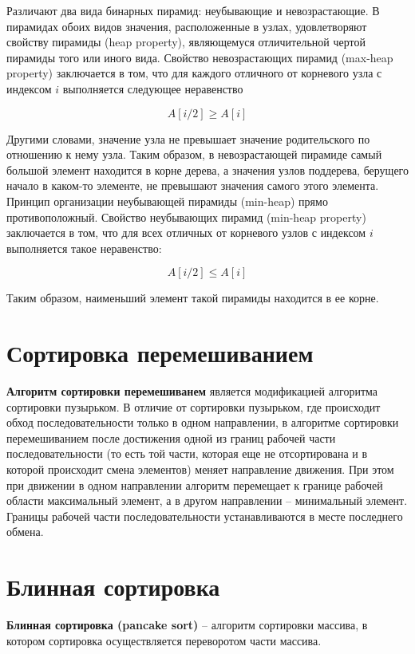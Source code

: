 Различают два вида бинарных пирамид: неубывающие и невозрастающие. В пирамидах обоих видов значения, расположенные в узлах, удовлетворяют свойству пирамиды (heap property), являющемуся отличительной чертой пирамиды того или иного вида. Свойство невозрастающих пирамид (max-heap property) заключается в том, что для каждого отличного от корневого узла с индексом $i$ выполняется следующее неравенство

\begin{equation}
	A[i / 2] \geq A[i]
\end{equation}

Другими словами, значение узла не превышает значение родительского по отношению к нему узла. Таким образом, в невозрастающей пирамиде самый большой элемент находится в корне дерева, а значения узлов поддерева, берущего начало в каком-то элементе, не превышают значения самого этого элемента. Принцип организации неубывающей пирамиды (min-heap) прямо противоположный. Свойство неубывающих пирамид (min-heap property) заключается в том, что для всех отличных от корневого узлов с индексом $i$ выполняется такое неравенство:

\begin{equation}
	A[i / 2] \leq A[i]
\end{equation}

Таким образом, наименьший элемент такой пирамиды находится в ее корне.

\section{Сортировка перемешиванием}
\textbf{Алгоритм сортировки перемешиванем} является модификацией алгоритма
сортировки пузырьком. В отличие от сортировки пузырьком, где происходит обход
последовательности только в одном направлении, в алгоритме сортировки
перемешиванием после достижения одной из границ рабочей части
последовательности (то есть той части, которая еще не отсортирована и в которой
происходит смена элементов) меняет направление движения. При этом при движении
в одном направлении алгоритм перемещает к границе рабочей области максимальный
элемент, а в другом направлении -- минимальный элемент. Границы рабочей части
последовательности устанавливаются в месте последнего обмена. 

\section{Блинная сортировка}
\textbf{Блинная сортировка (pancake sort)} – алгоритм сортировки массива, в котором сортировка осуществляется переворотом части массива.

